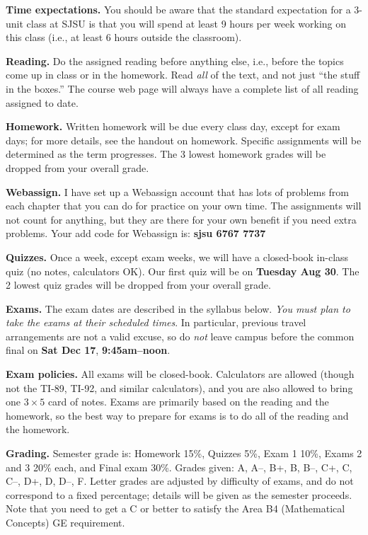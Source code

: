 \documentclass[letterpaper]{article}
\begin{document}
{\bf Time expectations.\/} You should be aware that the standard
expectation for
a 3-unit class at SJSU is that you will spend at least 9 hours
per week working on this class (i.e., at least 6 hours outside
the classroom).

{\bf Reading.}  Do the assigned reading before anything else, i.e.,
before the topics come up in class or in the homework.  Read {\it
  all\/} of the text, and not just ``the stuff in the boxes.''  The
course web page will always have a complete list of all reading
assigned to date.

{\bf Homework.}  Written homework will be due every class day, except for exam
days; for more details, see the handout on homework.  Specific
assignments will be determined as the term progresses.  The 3 lowest homework 
grades will be dropped from your overall grade.

{\bf Webassign.}  I have set up a Webassign account that has lots of problems
from each chapter that you can do for practice on your own time. The assignments will
not count for anything, but they are there for your own benefit if you need extra problems. 
Your add code for Webassign is: {\bf sjsu 6767 7737}

{\bf Quizzes.}  Once a week, except exam weeks, we will have a
closed-book in-class quiz (no notes, calculators OK).  Our first quiz
will be on {\bf Tuesday Aug 30}. The 2 lowest quiz grades will be dropped
from your overall grade.

\newcommand{\finaldate}{Sat Dec 17}
\newcommand{\finaltime}{9:45am--noon}

{\bf Exams.}  The exam dates are described in the syllabus below.
{\it You must plan to take the exams at their scheduled times}.  In
particular, previous travel arrangements are not a valid excuse, so do
{\it not\/} leave campus before the common final on {\bf\finaldate},
{\bf\finaltime}.

{\bf Exam policies.}  All exams will be closed-book.  Calculators are
allowed (though not the TI-89, TI-92, and similar calculators), and
you are also allowed to bring one $3\times 5$ card of notes.  Exams
are primarily based on the reading and the homework, so the best way
to prepare for exams is to do all of the reading and the homework.

{\bf Grading.}  Semester grade is: Homework 15\%, Quizzes 5\%, Exam 1
10\%, Exams 2 and 3 20\% each, and Final exam 30\%.  Grades given:
A, A--, B+, B, B--, C+, C, C--, D+, D, D--, F.  Letter grades are
adjusted by difficulty of exams, and do not correspond to a fixed
percentage; details will be given as the semester proceeds.  Note
that you need to get a C or better to satisfy the Area B4 (Mathematical
Concepts) GE
requirement.
\end{document}
